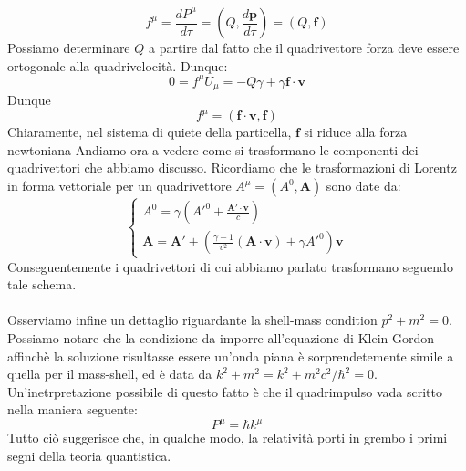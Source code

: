 \documentclass[a4paper,11pt]{book}
\theoremstyle{plain}
\theoremstyle{definition}
\begin{document}
\[
f^{\mu}=\frac{dP^{\mu}}{d\tau}=\left( Q,\frac{d\textbf{p}}{d\tau}\right)=(Q,\textbf{f})
\]
Possiamo determinare $Q$ a partire dal fatto che il quadrivettore forza deve essere ortogonale alla quadrivelocità. Dunque:
\[
0=f^{\mu}U_{\mu} = -Q\gamma+\gamma \textbf{f}\cdot\textbf{v}
\]
Dunque
\[
f^{\mu} = (\textbf{f}\cdot \textbf{v},\textbf{f})
\]
Chiaramente, nel sistema di quiete della particella, $\textbf{f}$ si riduce alla forza newtoniana Andiamo ora a vedere come si trasformano le componenti dei quadrivettori che abbiamo discusso. Ricordiamo che le trasformazioni di Lorentz in forma vettoriale per un quadrivettore $A^{\mu} = (A^0,\textbf{A})$ sono date da:
\begin{equation}\label{eq:lorvec}
\begin{cases}
A^0 = \gamma\left( A'^0+\frac{\textbf{A}'\cdot\textbf{v}}{c} \right) \\
\textbf{A} = \textbf{A}' +\left( \frac{\gamma-1}{v^2}(\textbf{A}\cdot \textbf{v})+\gamma A'^0 \right)\textbf{v}
\end{cases}
\end{equation}
Conseguentemente i quadrivettori di cui abbiamo parlato trasformano seguendo tale schema. 
\\
\\
Osserviamo infine un dettaglio riguardante la shell-mass condition $p^2+m^2=0$. Possiamo notare che la condizione da imporre all'equazione di Klein-Gordon affinchè la soluzione risultasse essere un'onda piana è sorprendetemente simile a quella per il mass-shell, ed è data da $k^2+m^2=k^2+m^2c^2/ \hbar^2=0$. Un'inetrpretazione possibile di questo fatto è che il quadrimpulso vada scritto nella maniera seguente:
\[
P^{\mu}=\hbar k^{\mu}
\]
Tutto ciò suggerisce che, in qualche modo, la relatività porti in grembo i primi segni della teoria quantistica. 
\end{document}
